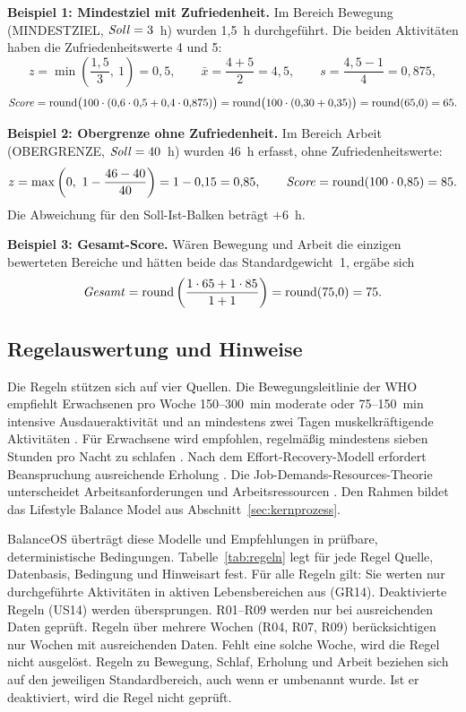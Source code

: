 \textbf{Beispiel 1: Mindestziel mit Zufriedenheit.} Im Bereich Bewegung (MINDESTZIEL, $\mathit{Soll} = 3$~h) wurden 1,5~h durchgeführt. Die beiden Aktivitäten haben die Zufriedenheitswerte 4 und 5:
\[ z = \min\left(\frac{1{,}5}{3},\ 1\right) = 0{,}5, \qquad \bar{x} = \frac{4+5}{2} = 4{,}5, \qquad s = \frac{4{,}5 - 1}{4} = 0{,}875, \]
\[ \mathit{Score} = \mathrm{round}\bigl(100 \cdot (0{,}6 \cdot 0{,}5 + 0{,}4 \cdot 0{,}875)\bigr) = \mathrm{round}\bigl(100 \cdot (0{,}30 + 0{,}35)\bigr) = \mathrm{round}(65{,}0) = 65. \]

\textbf{Beispiel 2: Obergrenze ohne Zufriedenheit.} Im Bereich Arbeit (OBERGRENZE, $\mathit{Soll} = 40$~h) wurden 46~h erfasst, ohne Zufriedenheitswerte:
\[ z = \max\left(0,\ 1 - \frac{46 - 40}{40}\right) = 1 - 0{,}15 = 0{,}85, \qquad \mathit{Score} = \mathrm{round}(100 \cdot 0{,}85) = 85. \]
Die Abweichung für den Soll-Ist-Balken beträgt $+6$~h.

\textbf{Beispiel 3: Gesamt-Score.} Wären Bewegung und Arbeit die einzigen bewerteten Bereiche und hätten beide das Standardgewicht~1, ergäbe sich
\[ \mathit{Gesamt} = \mathrm{round}\left(\frac{1 \cdot 65 + 1 \cdot 85}{1 + 1}\right) = \mathrm{round}(75{,}0) = 75. \]

\subsection{Regelauswertung und Hinweise}\label{sec:regelauswertung}
Die Regeln stützen sich auf vier Quellen. Die Bewegungsleitlinie der \ac{WHO} empfiehlt Erwachsenen pro Woche 150--300~min moderate oder 75--150~min intensive Ausdaueraktivität und an mindestens zwei Tagen muskelkräftigende Aktivitäten \parencite[S.~1451]{bull2020}. Für Erwachsene wird empfohlen, regelmäßig mindestens sieben Stunden pro Nacht zu schlafen \parencite[S.~843]{watson2015}. Nach dem Effort-Recovery-Modell erfordert Beanspruchung ausreichende Erholung \parencite[S.~5--33]{meijman1998}. Die Job-Demands-Resources-Theorie unterscheidet Arbeitsanforderungen und Arbeitsressourcen \parencite[S.~274]{bakker2017}. Den Rahmen bildet das Lifestyle Balance Model aus Abschnitt~\ref{sec:kernprozess}.

BalanceOS überträgt diese Modelle und Empfehlungen in prüfbare, deterministische Bedingungen. Tabelle~\ref{tab:regeln} legt für jede Regel Quelle, Datenbasis, Bedingung und Hinweisart fest. Für alle Regeln gilt: Sie werten nur durchgeführte Aktivitäten in aktiven Lebensbereichen aus (GR14). Deaktivierte Regeln (US14) werden übersprungen. R01--R09 werden nur bei ausreichenden Daten geprüft. Regeln über mehrere Wochen (R04, R07, R09) berücksichtigen nur Wochen mit ausreichenden Daten. Fehlt eine solche Woche, wird die Regel nicht ausgelöst. Regeln zu Bewegung, Schlaf, Erholung und Arbeit beziehen sich auf den jeweiligen Standardbereich, auch wenn er umbenannt wurde. Ist er deaktiviert, wird die Regel nicht geprüft.


